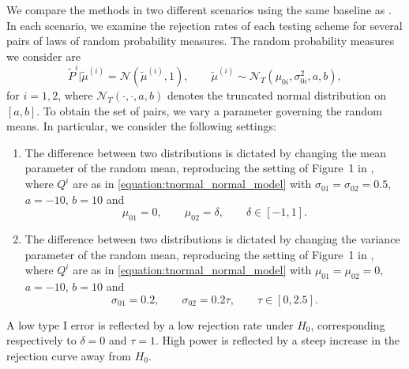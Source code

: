 We compare the methods in two different scenarios using the same baseline as \cite{dubey2019frechet}. In each scenario, we examine the rejection rates of each testing scheme for several pairs of laws of random probability measures. The random probability measures we consider are
\begin{equation}\label{equation:tnormal_normal_model}
\tilde P^i| \tilde \mu^{(i)} = \mathcal{N}(\tilde \mu^{(i)}, 1), \qquad \tilde \mu^{(i)} \sim  \mathcal{N}_T(\mu_{0i}, \sigma^2_{0i} , a, b),
\end{equation}
for $i = 1,2$, where $\mathcal{N}_T (\cdot, \cdot, a,b)$ denotes the truncated normal distribution on $[a,b]$. To obtain the set of pairs, we vary a parameter governing the random means. In particular, we consider the following settings:
\begin{enumerate}
\item The difference between two distributions is dictated by changing the mean parameter of the random mean, reproducing the setting of Figure~1 in \cite{dubey2019frechet}, where $Q^i$ are as in \eqref{equation:tnormal_normal_model} with $\sigma_{01} = \sigma_{02} = 0.5$, $a = -10$, $b = 10$ and
\[
\mu_{01} = 0, \qquad \mu_{02} = \delta, \qquad \delta \in [-1, 1]. 
\]
\item The difference between two distributions is dictated by changing the variance parameter of the random mean, reproducing the setting of Figure~1 in \cite{dubey2019frechet}, where $Q^i$ are as in \eqref{equation:tnormal_normal_model} with $\mu_{01} = \mu_{02} = 0$, $a = -10$, $b = 10$ and
\[
\sigma_{01} = 0.2, \qquad \sigma_{02} = 0.2\tau, \qquad  \tau \in [0, 2.5].
\]
\end{enumerate}
A low type I error is reflected by a low rejection rate under $H_0$, corresponding respectively to $\delta = 0$ and  $\tau = 1$. High power is reflected by a steep increase in the rejection curve away from $H_0$.

